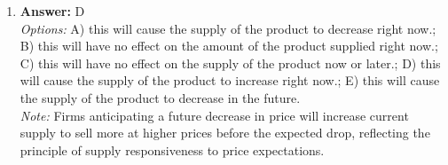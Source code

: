 \documentclass[12pt]{article}
\begin{document}
\begin{enumerate}[label=\arabic*.]
\\ \textit{Note:} An increase in corporate optimism leads to higher expected future profits, prompting firms to demand more loanable funds for investment, which in turn raises the equilibrium interest rate in the market.
\item \textbf{Answer:} D
\\ \textit{Options:} A) this will cause the supply of the product to decrease right now.; B) this will have no effect on the amount of the product supplied right now.; C) this will have no effect on the supply of the product now or later.; D) this will cause the supply of the product to increase right now.; E) this will cause the supply of the product to decrease in the future.
\\ \textit{Note:} Firms anticipating a future decrease in price will increase current supply to sell more at higher prices before the expected drop, reflecting the principle of supply responsiveness to price expectations.
\end{enumerate}
\end{document}
